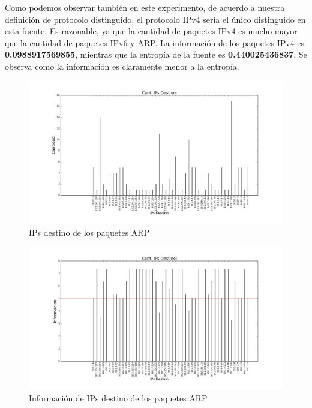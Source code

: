 Como podemos observar también en este experimento, de acuerdo a nuestra definición de protocolo distinguido, el protocolo IPv4 sería el único distinguido en esta fuente. Es razonable, ya que la cantidad de paquetes IPv4 es mucho mayor que la cantidad de paquetes IPv6 y ARP. La información de los paquetes IPv4 es \textbf{0.0988917569855}, mientras que la entropía de la fuente es \textbf{0.440025436837}. Se observa como la información es claramente menor a la entropía.

\begin{figure}[H]
       \centering
       \includegraphics[width=1\textwidth]{../resultados/labo-corrida3/histogram_dst.png}
       \caption{IPs destino de los paquetes ARP}
       \label{red-Starbucks-dst}
\end{figure}


\begin{figure}[H]
       \centering
       \includegraphics[width=1\textwidth]{../resultados/labo-corrida3/histogram_dst_information.png}
       \caption{Información de IPs destino de los paquetes ARP}
       \label{red-Starbucks-dst-information}
\end{figure}


